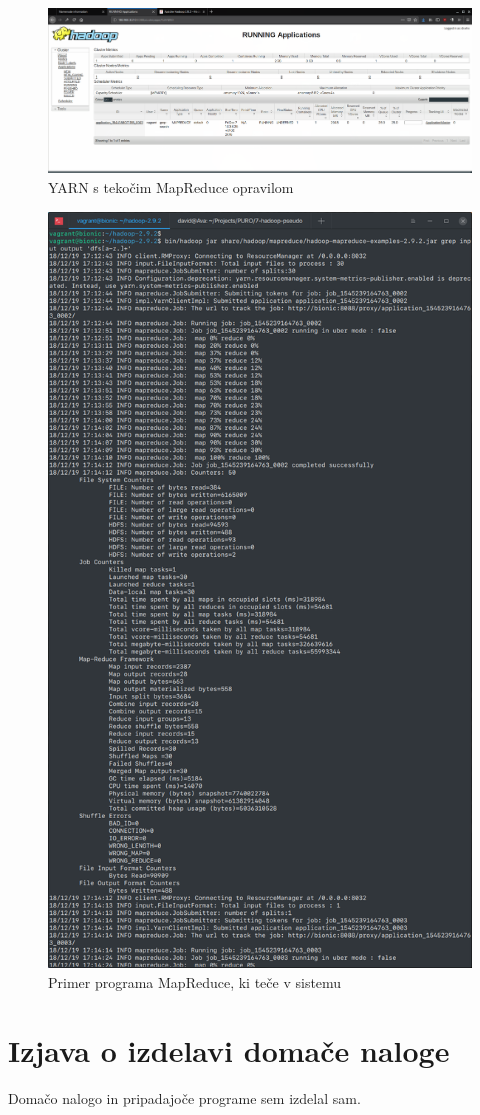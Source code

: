 \documentclass[a4paper,11pt]{article}
\begin{document}
\begin{figure}
\begin{center}
\includegraphics[scale=0.33]{./mapreduce-running.png}
\caption{YARN s tekočim MapReduce opravilom}
\label{yarn}
\end{center}
\end{figure}

\begin{figure}
\begin{center}
\includegraphics[scale=0.5]{./mapreduce-example.png}
\caption{Primer programa MapReduce, ki teče v sistemu}
\label{example}
\end{center}
\end{figure}


\section{Izjava o izdelavi domače naloge}
Domačo nalogo in pripadajoče programe sem izdelal sam.
\end{document}
